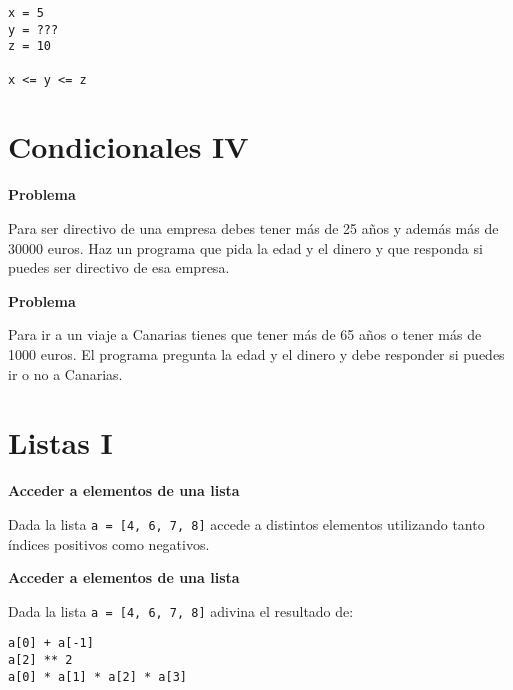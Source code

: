 \documentclass[a4paper, 11pt]{scrartcl}
\newenvironment{code}{\begin{tcolorbox}[colback=red!2!white]}{\end{tcolorbox}}
\begin{document}
\smallskip

\begin{code}

\begin{verbatim}
x = 5
y = ???
z = 10

x <= y <= z
\end{verbatim}

\end{code}

\newpage

\section{Condicionales IV}



\noindent\textbf{\sffamily Problema}

Para ser directivo de una empresa debes tener más de 25 años y además más de 30000 euros. Haz un programa que pida la edad y el dinero y que responda si puedes ser directivo de esa empresa.





\noindent\textbf{\sffamily Problema}

Para ir a un viaje a Canarias tienes que tener más de 65 años o tener más de 1000 euros. El programa pregunta la edad y el dinero y debe responder si puedes ir o no a Canarias.


\newpage

\section{Listas I}






\noindent\textbf{\sffamily Acceder a elementos de una lista}

Dada la lista \verb|a = [4, 6, 7, 8]| accede a distintos elementos utilizando tanto índices positivos como negativos.





\noindent\textbf{\sffamily Acceder a elementos de una lista}

Dada la lista \verb|a = [4, 6, 7, 8]| adivina el resultado de:

\smallskip

\begin{code}

\begin{verbatim}
a[0] + a[-1]
a[2] ** 2
a[0] * a[1] * a[2] * a[3]
\end{verbatim}

\end{code}
\end{document}
